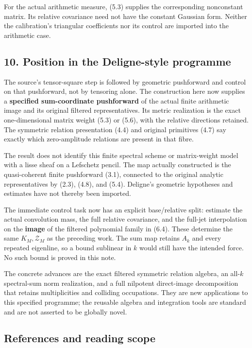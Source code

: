 \documentclass[
]{article}
\begin{document}
For the actual arithmetic measure, (5.3) supplies the corresponding
nonconstant matrix. Its relative covariance need not have the constant
Gaussian form. Neither the calibration's triangular coefficients nor its
control are imported into the arithmetic case.

\subsection{10. Position in the Deligne-style
programme}\label{position-in-the-deligne-style-programme}

The source's tensor-square step is followed by geometric pushforward and
control on that pushforward, not by tensoring alone. The construction
here now supplies a \textbf{specified sum-coordinate pushforward} of the
actual finite arithmetic image and its original filtered
representatives. Its metric realization is the exact one-dimensional
matrix weight (5.3) or (5.6), with the relative directions retained. The
symmetric relation presentation (4.4) and original primitives (4.7) say
exactly which zero-amplitude relations are present in that fibre.

The result does not identify this finite spectral scheme or
matrix-weight model with a lisse sheaf on a Lefschetz pencil. The map
actually constructed is the quasi-coherent finite pushforward (3.1),
connected to the original analytic representatives by (2.3), (4.8), and
(5.4). Deligne's geometric hypotheses and estimates have not thereby
been imported.

The immediate control task now has an explicit base/relative split:
estimate the actual convolution mass, the full relative covariance, and
the full-jet interpolation on the \textbf{image} of the filtered
polynomial family in (6.4). These determine the same
\(K_M,\mathcal Z_M\) as the preceding work. The sum map retains \(A_k\)
and every repeated eigenline, so a bound sublinear in \(k\) would still
have the intended force. No such bound is proved in this note.

The concrete advances are the exact filtered symmetric relation algebra,
an all-\(k\) spectral-sum norm realization, and a full nilpotent
direct-image decomposition that retains multiplicities and colliding
occupations. They are new applications to this specified programme; the
reusable algebra and integration tools are standard and are not asserted
to be globally novel.

\subsection{References and reading
scope}\label{references-and-reading-scope}
\end{document}
